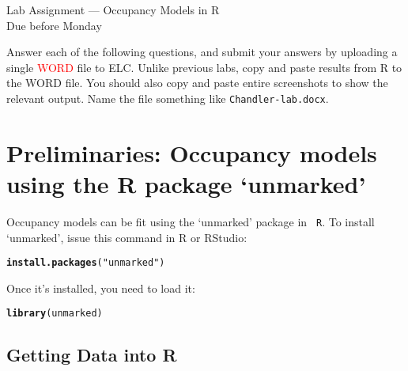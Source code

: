\documentclass[12pt]{article}\usepackage[]{graphicx}\usepackage[]{color}
\makeatletter
\newcommand{\hlstr}[1]{\textcolor[rgb]{0.192,0.494,0.8}{#1}}%
\newcommand{\hlstd}[1]{\textcolor[rgb]{0.345,0.345,0.345}{#1}}%
\newcommand{\hlkwd}[1]{\textcolor[rgb]{0.737,0.353,0.396}{\textbf{#1}}}%
\newenvironment{kframe}{%
 \def\at@end@of@kframe{}%
 \ifinner\ifhmode%
  \def\at@end@of@kframe{\end{minipage}}%
  \begin{minipage}{\columnwidth}%
 \fi\fi%
 \def\FrameCommand##1{\hskip\@totalleftmargin \hskip-\fboxsep
 \colorbox{shadecolor}{##1}\hskip-\fboxsep
     \hskip-\linewidth \hskip-\@totalleftmargin \hskip\columnwidth}%
 \MakeFramed {\advance\hsize-\width
   \@totalleftmargin\z@ \linewidth\hsize
   \@setminipage}}%
 {\par\unskip\endMakeFramed%
 \at@end@of@kframe}
\newenvironment{knitrout}{}{} %
\makeatother
\begin{document}
{
  \Large
  \centering
  Lab Assignment --- Occupancy Models in R \\
  Due before Monday \par
}

\vspace{10pt}


Answer each of the following questions, and submit your answers by 
uploading a single \textcolor{red}{WORD} file to ELC. Unlike previous labs,
copy and paste results from R to the WORD file. You should
also copy and paste entire screenshots to show the relevant output. Name  
the file something like \texttt{Chandler-lab.docx}.  




\section*{\normalsize Preliminaries: Occupancy models using the R
package `unmarked'}


Occupancy models can be fit using the `unmarked' package in {\tt
R}. To install `unmarked', issue this command in R or RStudio: 

\begin{knitrout}
\color{fgcolor}\begin{kframe}
\begin{alltt}
\hlkwd{install.packages}\hlstd{(}\hlstr{"unmarked"}\hlstd{)}
\end{alltt}
\end{kframe}
\end{knitrout}

Once it's installed, you need to load it:

\begin{knitrout}
\color{fgcolor}\begin{kframe}
\begin{alltt}
\hlkwd{library}\hlstd{(unmarked)}
\end{alltt}
\end{kframe}
\end{knitrout}



\subsection*{\normalsize Getting Data into R}
\vspace{-10pt}
\end{document}
